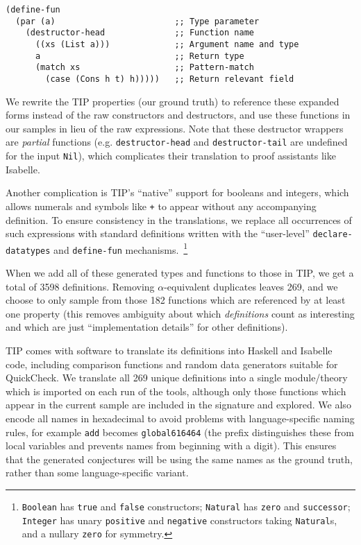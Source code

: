 \begin{samepage}
\begin{verbatim}
(define-fun
  (par (a)                        ;; Type parameter
    (destructor-head              ;; Function name
      ((xs (List a)))             ;; Argument name and type
      a                           ;; Return type
      (match xs                   ;; Pattern-match
        (case (Cons h t) h)))))   ;; Return relevant field
\end{verbatim}
\end{samepage}

\begin{sloppypar}
  We rewrite the TIP properties (our ground truth) to reference these expanded
  forms instead of the raw constructors and destructors, and use these functions
  in our samples in lieu of the raw expressions. Note that these destructor
  wrappers are \emph{partial} functions (e.g. \texttt{destructor-head} and
  \texttt{destructor-tail} are undefined for the input \texttt{Nil}), which
  complicates their translation to proof assistants like Isabelle.
\end{sloppypar}

Another complication is TIP's ``native'' support for booleans and integers,
which allows numerals and symbols like \texttt{+} to appear without any
accompanying definition. To ensure consistency in the translations, we replace
all occurrences of such expressions with standard definitions written with the
``user-level'' \texttt{declare-datatypes} and \texttt{define-fun}
mechanisms.~\footnote{\texttt{Boolean} has \texttt{true} and \texttt{false}
  constructors; \texttt{Natural} has \texttt{zero} and \texttt{successor};
  \texttt{Integer} has unary \texttt{positive} and \texttt{negative}
  constructors taking \texttt{Natural}s, and a nullary \texttt{zero} for
  symmetry.}

When we add all of these generated types and functions to those in TIP, we get a
total of 3598 definitions. Removing $\alpha$-equivalent duplicates leaves 269,
and we choose to only sample from those 182 functions which are referenced by at
least one property (this removes ambiguity about which \emph{definitions} count
as interesting and which are just ``implementation details'' for other
definitions).

TIP comes with software to translate its definitions into Haskell and Isabelle
code, including comparison functions and random data generators suitable for
QuickCheck. We translate all 269 unique definitions into a single module/theory
which is imported on each run of the tools, although only those functions which
appear in the current sample are included in the signature and explored. We also
encode all names in hexadecimal to avoid problems with language-specific naming
rules, for example \texttt{add} becomes \texttt{global616464} (the prefix
distinguishes these from local variables and prevents names from beginning with
a digit). This ensures that the generated conjectures will be using the same
names as the ground truth, rather than some language-specific variant.

